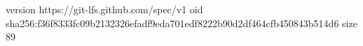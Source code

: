 version https://git-lfs.github.com/spec/v1
oid sha256:f36f8333fc09b2132326efadf9eda701edf8222b90d2df464cfb450843b514d6
size 89

